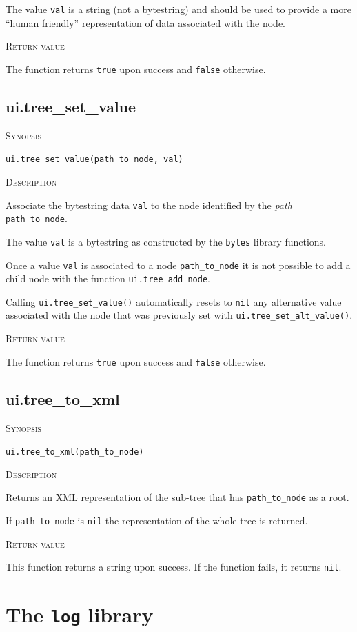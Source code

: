 \documentclass[11pt]{report}
\newcommand{\mansection}[1]{\vspace{0.5em}\par\noindent\textsc{#1}\vspace{0.5em}\par}
\newcommand{\syn}[1]{\texttt{#1}}
\begin{document}
  The value \syn{val} is a string (not a bytestring) and should be used to provide a more 
  ``human friendly'' representation of data associated with the node.

\mansection{Return value}
  The function returns \syn{true} upon success and \syn{false} otherwise.


\subsection{ui.tree\_set\_value}

\mansection{Synopsis}
\syn{ui.tree\_set\_value(path\_to\_node, val)}

\mansection{Description}
  Associate the bytestring data \syn{val} to the node identified by the \emph{path} 
  \syn{path\_to\_node}.

  The value \syn{val} is a bytestring as constructed by the \syn{bytes} library functions.

  Once a value \syn{val} is associated to a node \syn{path\_to\_node} 
  it is not possible to add a child node with the function \syn{ui.tree\_add\_node}.

  Calling \syn{ui.tree\_set\_value()} automatically resets to \syn{nil} any alternative value
  associated with the node that was previously set with \syn{ui.tree\_set\_alt\_value()}.

\mansection{Return value}
  The function returns \syn{true} upon success and \syn{false} otherwise.


\subsection{ui.tree\_to\_xml}

\mansection{Synopsis}
\syn{ui.tree\_to\_xml(path\_to\_node)}

\mansection{Description}
  Returns an XML representation of the sub-tree that has \syn{path\_to\_node} 
  as a root.
	  
  If \syn{path\_to\_node} is \syn{nil} the representation of the whole 
  tree is returned.
  
\mansection{Return value}
  This function returns a string upon success.
  If the function fails, it returns \syn{nil}.


\section{The \syn{log} library}
\end{document}
